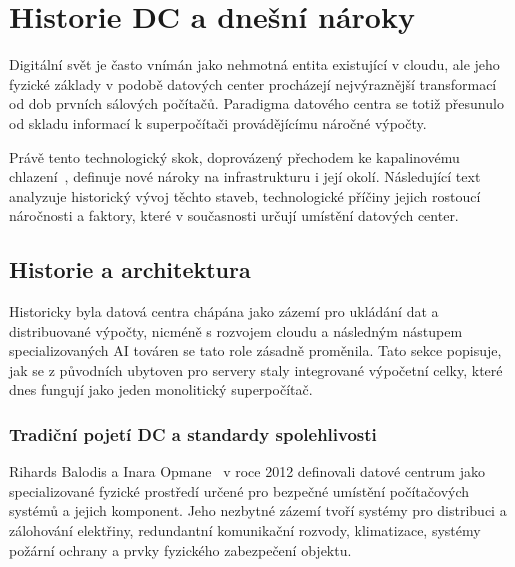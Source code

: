\chapter{Historie DC a dnešní nároky}
\label{chap:historie}

Digitální svět je často vnímán jako nehmotná entita existující v cloudu, ale jeho fyzické základy v podobě datových center procházejí nejvýraznější transformací od dob prvních sálových počítačů. Paradigma datového centra se totiž přesunulo od skladu informací k superpočítači provádějícímu náročné výpočty.~\cite[s.~11]{ranganathan_twenty_2024}

Právě tento technologický skok, doprovázený přechodem ke kapalinovému chlazení~\cite{bizo_silicon_2022}, definuje nové nároky na infrastrukturu i její okolí. Následující text analyzuje historický vývoj těchto staveb, technologické příčiny jejich rostoucí náročnosti a faktory, které v současnosti určují umístění datových center.

\section{Historie a architektura}
\label{sec:historie}


Historicky byla datová centra chápána jako zázemí pro ukládání dat a distribuované výpočty, nicméně s rozvojem cloudu a následným nástupem specializovaných AI továren se tato role zásadně proměnila. Tato sekce popisuje, jak se z původních ubytoven pro servery staly integrované výpočetní celky, které dnes fungují jako jeden monolitický superpočítač. \cite{ranganathan_twenty_2024, barroso_data_2026, barroso_brief_2021}

\subsection{Tradiční pojetí DC a standardy spolehlivosti}
\label{subsec:tradice}

Rihards Balodis a Inara Opmane~\cite[s.~180--181]{tatnall_reflections_2012} v roce 2012 definovali datové centrum jako specializované fyzické prostředí určené pro bezpečné umístění počítačových systémů a jejich komponent. Jeho nezbytné zázemí tvoří systémy pro distribuci a zálohování elektřiny, redundantní komunikační rozvody, klimatizace, systémy požární ochrany a prvky fyzického zabezpečení objektu.

